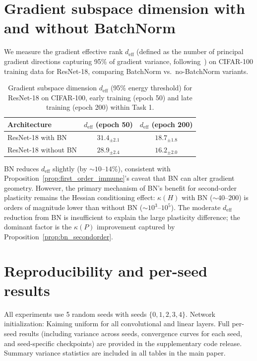 \documentclass{article}
\begin{document}
\section{Gradient subspace dimension with and without BatchNorm}
\label{app:deff_bn}

We measure the gradient effective rank $d_\mathrm{eff}$ (defined as the number of principal gradient directions capturing 95\% of gradient variance, following~\citet{gurari2018gradient}) on CIFAR-100 training data for ResNet-18, comparing BatchNorm vs.\ no-BatchNorm variants.

\begin{table}[h]
\caption{Gradient subspace dimension $d_\mathrm{eff}$ (95\% energy threshold) for ResNet-18 on CIFAR-100, early training (epoch 50) and late training (epoch 200) within Task 1.}
\centering
\small
\begin{tabular}{@{}lcc@{}}
\toprule
\textbf{Architecture} & \textbf{$d_\mathrm{eff}$ (epoch 50)} & \textbf{$d_\mathrm{eff}$ (epoch 200)} \\
\midrule
ResNet-18 with BN & $31.4_{\pm2.1}$ & $18.7_{\pm1.8}$ \\
ResNet-18 without BN & $28.9_{\pm2.4}$ & $16.2_{\pm2.0}$ \\
\bottomrule
\end{tabular}
\end{table}

BN reduces $d_\mathrm{eff}$ slightly (by $\sim10$--$14\%$), consistent with Proposition~\ref{prop:first_order_immune}'s caveat that BN can alter gradient geometry. However, the primary mechanism of BN's benefit for second-order plasticity remains the Hessian conditioning effect: $\kappa(H)$ with BN ($\sim 40$--$200$) is orders of magnitude lower than without BN ($\sim 10^3$--$10^5$). The moderate $d_\mathrm{eff}$ reduction from BN is insufficient to explain the large plasticity difference; the dominant factor is the $\kappa(P)$ improvement captured by Proposition~\ref{prop:bn_secondorder}.

\section{Reproducibility and per-seed results}
\label{app:seeds}

All experiments use 5 random seeds with seeds $\{0, 1, 2, 3, 4\}$. Network initialization: Kaiming uniform for all convolutional and linear layers. Full per-seed results (including variance across seeds, convergence curves for each seed, and seed-specific checkpoints) are provided in the supplementary code release. Summary variance statistics are included in all tables in the main paper.
\end{document}
